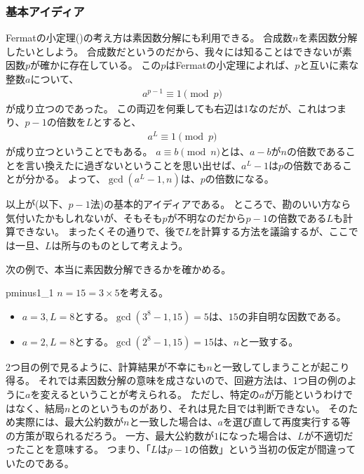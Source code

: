 \subsubsection{基本アイディア}
Fermatの小定理()の考え方は素因数分解にも利用できる。
合成数$n$を素因数分解したいとしよう。
合成数だというのだから、我々には知ることはできないが素因数$p$が確かに存在している。
この$p$はFermatの小定理によれば、$p$と互いに素な整数$a$について、
\begin{align*}
a^{p-1} \equiv 1 \pmod{p}
\end{align*}
が成り立つのであった。
この両辺を何乗しても右辺は1なのだが、これはつまり、$p-1$の倍数を$L$とすると、
\begin{align*}
a^{L} \equiv 1 \pmod{p}
\end{align*}
が成り立つということでもある。
$a\equiv b\pmod{n}$とは、$a-b$が$n$の倍数であることを言い換えたに過ぎないということを思い出せば、$a^L-1$は$p$の倍数であることが分かる。
よって、$\gcd(a^{L}-1, n)$は、$p$の倍数になる。

以上が(以下、$p-1$法)\cite{pollard_1974}の基本的アイディアである。
ところで、勘のいい方なら気付いたかもしれないが、そもそも$p$が不明なのだから$p-1$の倍数である$L$も計算できない。
まったくその通りで、後で$L$を計算する方法を議論するが、ここでは一旦、$L$は所与のものとして考えよう。

次の例で、本当に素因数分解できるかを確かめる。

\begin{Exam}{}{pminus1_1}
$n=15=3\times5$を考える。
\begin{itemize}
\item $a=3,L=8$とする。$\gcd(3^8-1,15)=5$は、$15$の非自明な因数である。
\item $a=2,L=8$とする。$\gcd(2^8-1,15)=15$は、$n$と一致する。
\end{itemize}
\end{Exam}

2つ目の例で見るように、計算結果が不幸にも$n$と一致してしまうことが起こり得る。
それでは素因数分解の意味を成さないので、回避方法は、1つ目の例のように$a$を変えるということが考えられる。
ただし、特定の$a$が万能というわけではなく、結局$n$とのというものがあり、それは見た目では判断できない。
そのため実際には、最大公約数が$n$と一致した場合は、$a$を選び直して再度実行する等の方策が取られるだろう。
一方、最大公約数が$1$になった場合は、$L$が不適切だったことを意味する。
つまり、「$L$は$p-1$の倍数」という当初の仮定が間違っていたのである。

